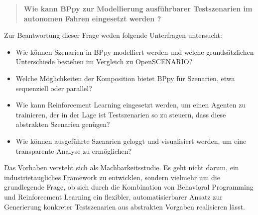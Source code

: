 \begin{quote}
\textbf{Wie kann BPpy zur Modellierung ausführbarer Testszenarien im autonomen Fahren eingesetzt werden ?}
\end{quote}

Zur Beantwortung dieser Frage weden folgende Unterfragen untersucht:
\begin{itemize}
    \item Wie können Szenarien in BPpy modelliert werden und welche grundsätzlichen Unterschiede bestehen im Vergleich zu OpenSCENARIO?
    \item Welche Möglichkeiten der Komposition bietet BPpy für Szenarien, etwa sequenziell oder parallel?
    \item Wie kann Reinforcement Learning eingesetzt werden, um einen Agenten zu trainieren, der in der Lage ist Testszenarien so zu steuern, dass diese abstrakten Szenarien genügen?
    \item Wie können ausgeführte Szenarien geloggt und visualisiert werden, um eine transparente Analyse zu ermöglichen?
\end{itemize}

Das Vorhaben versteht sich als Machbarkeitsstudie. Es geht nicht darum, ein industrietaugliches Framework zu entwicklen, sondern vielmehr um die grundlegende Frage, ob sich durch die Kombination von Behavioral Programming und Reinforcement Learning ein flexibler, automatisierbarer Ansatz zur Generierung konkreter Testszenarien aus abstrakten Vorgaben realisieren lässt.